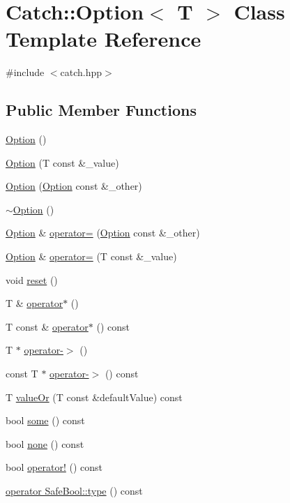 \hypertarget{class_catch_1_1_option}{}\section{Catch\+:\+:Option$<$ T $>$ Class Template Reference}
\label{class_catch_1_1_option}


{\ttfamily \#include $<$catch.\+hpp$>$}

\subsection*{Public Member Functions}
\begin{DoxyCompactItemize}
\item 
\hyperlink{class_catch_1_1_option_a8efb01b593d798decc80cbbdf311f2a3}{Option} ()
\item 
\hyperlink{class_catch_1_1_option_a5aeb9c22d48a6882bdf5fb4730b06c86}{Option} (T const \&\+\_\+value)
\item 
\hyperlink{class_catch_1_1_option_af02f2e4559f06384baec0def8c68c5fd}{Option} (\hyperlink{class_catch_1_1_option}{Option} const \&\+\_\+other)
\item 
\hyperlink{class_catch_1_1_option_a37fe90bb47bb909f150a5ad6be25581a}{$\sim$\+Option} ()
\item 
\hyperlink{class_catch_1_1_option}{Option} \& \hyperlink{class_catch_1_1_option_a78c65b15dd6b2fbd04c5012c43017c8f}{operator=} (\hyperlink{class_catch_1_1_option}{Option} const \&\+\_\+other)
\item 
\hyperlink{class_catch_1_1_option}{Option} \& \hyperlink{class_catch_1_1_option_a2be7e343ab22d6061726d32ab4622653}{operator=} (T const \&\+\_\+value)
\item 
void \hyperlink{class_catch_1_1_option_a37b4e0e5d4d56296adacd267a616f4e0}{reset} ()
\item 
T \& \hyperlink{class_catch_1_1_option_afd989852fa453731c3190dac63caccb0}{operator$\ast$} ()
\item 
T const  \& \hyperlink{class_catch_1_1_option_a734fc9c2eb1a1f7f8e8f6a4eb12160f0}{operator$\ast$} () const
\item 
T $\ast$ \hyperlink{class_catch_1_1_option_acad340798a16c8f700f8763119e90f31}{operator-\/$>$} ()
\item 
const T $\ast$ \hyperlink{class_catch_1_1_option_ae8343cbc36dbb95b2dce333d2a6fdc28}{operator-\/$>$} () const
\item 
T \hyperlink{class_catch_1_1_option_a8d9ae2e30b0eb76fe134a6fbc8423124}{value\+Or} (T const \&default\+Value) const
\item 
bool \hyperlink{class_catch_1_1_option_a97c95829afbe92f2bcc5fd75b32c0825}{some} () const
\item 
bool \hyperlink{class_catch_1_1_option_a821753afdc3fac947a13a01fbe0d248e}{none} () const
\item 
bool \hyperlink{class_catch_1_1_option_a96dccb86bdf45ee0c08e122b6133bef3}{operator!} () const
\item 
\hyperlink{class_catch_1_1_option_a8ed8de7b072f893c85df14913dbbe197}{operator Safe\+Bool\+::type} () const
\end{DoxyCompactItemize}


